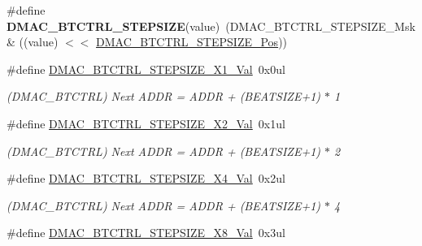 \begin{DoxyCompactItemize}
\item 
\hypertarget{group___s_a_m_l21___d_m_a_c_ga10aaa3d3c6a9119796e8f7bbe61c90d5}{}\#define {\bfseries D\+M\+A\+C\+\_\+\+B\+T\+C\+T\+R\+L\+\_\+\+S\+T\+E\+P\+S\+I\+Z\+E}(value)~(D\+M\+A\+C\+\_\+\+B\+T\+C\+T\+R\+L\+\_\+\+S\+T\+E\+P\+S\+I\+Z\+E\+\_\+\+Msk \& ((value) $<$$<$ \hyperlink{group___s_a_m_l21___d_m_a_c_gacf7558693207543fbd9048f7f76fa238}{D\+M\+A\+C\+\_\+\+B\+T\+C\+T\+R\+L\+\_\+\+S\+T\+E\+P\+S\+I\+Z\+E\+\_\+\+Pos}))\label{group___s_a_m_l21___d_m_a_c_ga10aaa3d3c6a9119796e8f7bbe61c90d5}

\item 
\hypertarget{group___s_a_m_l21___d_m_a_c_gaa089586d04726d1fe2a2b572764d51e3}{}\#define \hyperlink{group___s_a_m_l21___d_m_a_c_gaa089586d04726d1fe2a2b572764d51e3}{D\+M\+A\+C\+\_\+\+B\+T\+C\+T\+R\+L\+\_\+\+S\+T\+E\+P\+S\+I\+Z\+E\+\_\+\+X1\+\_\+\+Val}~0x0ul\label{group___s_a_m_l21___d_m_a_c_gaa089586d04726d1fe2a2b572764d51e3}

\begin{DoxyCompactList}\small\item\em (D\+M\+A\+C\+\_\+\+B\+T\+C\+T\+R\+L) Next A\+D\+D\+R = A\+D\+D\+R + (B\+E\+A\+T\+S\+I\+Z\+E+1) $\ast$ 1 \end{DoxyCompactList}\item 
\hypertarget{group___s_a_m_l21___d_m_a_c_ga80329ffceb6b9a1a59101ebf1311e4df}{}\#define \hyperlink{group___s_a_m_l21___d_m_a_c_ga80329ffceb6b9a1a59101ebf1311e4df}{D\+M\+A\+C\+\_\+\+B\+T\+C\+T\+R\+L\+\_\+\+S\+T\+E\+P\+S\+I\+Z\+E\+\_\+\+X2\+\_\+\+Val}~0x1ul\label{group___s_a_m_l21___d_m_a_c_ga80329ffceb6b9a1a59101ebf1311e4df}

\begin{DoxyCompactList}\small\item\em (D\+M\+A\+C\+\_\+\+B\+T\+C\+T\+R\+L) Next A\+D\+D\+R = A\+D\+D\+R + (B\+E\+A\+T\+S\+I\+Z\+E+1) $\ast$ 2 \end{DoxyCompactList}\item 
\hypertarget{group___s_a_m_l21___d_m_a_c_ga0ec2b4b8e13fa2dcc7076d99e5b0ce36}{}\#define \hyperlink{group___s_a_m_l21___d_m_a_c_ga0ec2b4b8e13fa2dcc7076d99e5b0ce36}{D\+M\+A\+C\+\_\+\+B\+T\+C\+T\+R\+L\+\_\+\+S\+T\+E\+P\+S\+I\+Z\+E\+\_\+\+X4\+\_\+\+Val}~0x2ul\label{group___s_a_m_l21___d_m_a_c_ga0ec2b4b8e13fa2dcc7076d99e5b0ce36}

\begin{DoxyCompactList}\small\item\em (D\+M\+A\+C\+\_\+\+B\+T\+C\+T\+R\+L) Next A\+D\+D\+R = A\+D\+D\+R + (B\+E\+A\+T\+S\+I\+Z\+E+1) $\ast$ 4 \end{DoxyCompactList}\item 
\hypertarget{group___s_a_m_l21___d_m_a_c_ga426419179c0a52bd86e40764396e365d}{}\#define \hyperlink{group___s_a_m_l21___d_m_a_c_ga426419179c0a52bd86e40764396e365d}{D\+M\+A\+C\+\_\+\+B\+T\+C\+T\+R\+L\+\_\+\+S\+T\+E\+P\+S\+I\+Z\+E\+\_\+\+X8\+\_\+\+Val}~0x3ul\label{group___s_a_m_l21___d_m_a_c_ga426419179c0a52bd86e40764396e365d}


\end{DoxyCompactItemize}
